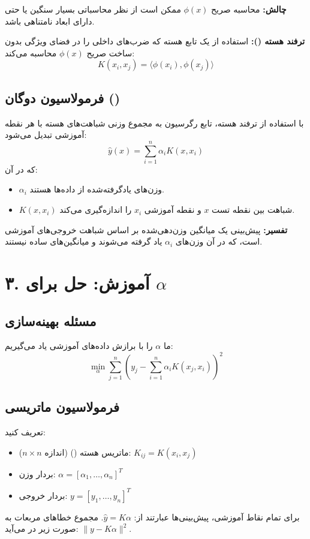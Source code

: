 \documentclass{article}
\begin{document}
\textbf{چالش:} محاسبه صریح $\phi(x)$ ممکن است از نظر محاسباتی بسیار سنگین یا حتی دارای ابعاد نامتناهی باشد.

\textbf{ترفند هسته ():} استفاده از یک تابع هسته که ضرب‌های داخلی را در فضای ویژگی بدون ساخت صریح $\phi(x)$ محاسبه می‌کند:
\[
K(x_i, x_j) = \langle \phi(x_i), \phi(x_j) \rangle
\]

\subsection*{فرمولاسیون دوگان ()}
با استفاده از ترفند هسته، تابع رگرسیون به مجموع وزنی شباهت‌های هسته با هر نقطه آموزشی تبدیل می‌شود:
\[
\hat{y}(x) = \sum_{i=1}^{n} \alpha_i K(x, x_i)
\]
که در آن:
\begin{itemize}
    \item $\alpha_i$ وزن‌های یادگرفته‌شده از داده‌ها هستند.
    \item $K(x, x_i)$ شباهت بین نقطه تست $x$ و نقطه آموزشی $x_i$ را اندازه‌گیری می‌کند.
\end{itemize}

\textbf{تفسیر:} پیش‌بینی یک میانگین وزن‌دهی‌شده بر اساس شباهت خروجی‌های آموزشی است، که در آن وزن‌های $\alpha_i$ یاد گرفته می‌شوند و میانگین‌های ساده نیستند.

\section*{۳. آموزش: حل برای $\alpha$}

\subsection*{مسئله بهینه‌سازی}
ما $\alpha$ را با برازش داده‌های آموزشی یاد می‌گیریم:
\[
\min_{\alpha} \sum_{j=1}^{n} \left( y_j - \sum_{i=1}^{n} \alpha_i K(x_j, x_i) \right)^2
\]

\subsection*{فرمولاسیون ماتریسی}
تعریف کنید:
\begin{itemize}
    \item ماتریس هسته () (اندازه $n \times n$): $K_{ij} = K(x_i, x_j)$
    \item بردار وزن: $\alpha = [\alpha_1, \dots, \alpha_n]^T$
    \item بردار خروجی: $y = [y_1, \dots, y_n]^T$
\end{itemize}
برای تمام نقاط آموزشی، پیش‌بینی‌ها عبارتند از: $\hat{y} = K \alpha$. مجموع خطاهای مربعات به صورت زیر در می‌آید: $\|y - K \alpha\|^2$.
\end{document}

